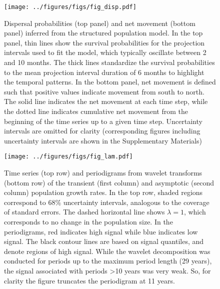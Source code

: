 \documentclass[11pt]{article}
\begin{document}
\clearpage
\begin{figure}
\centering
\texttt{[image: ../figures/figs/fig\_disp.pdf]}
\caption{\label{fig:disp}
Dispersal probabilities (top panel) and net movement (bottom panel)
inferred from the structured population model.
In the top panel,
thin lines show the survival probabilities for the projection intervals
used to fit the model, 
which typically oscillate between 2 and 10 months.
The thick lines standardize the survival probabilities to the mean 
projection interval duration of 6 months to highlight the temporal patterns.
In the bottom panel,
net movement is defined such that positive values indicate movement from
south to north.
The solid line indicates the net movement at each time step,
while the dotted line indicates cumulative net movement from the 
beginning of the time series up to a given time step.
Uncertainty intervals are omitted for clarity 
(corresponding figures including uncertainty intervals are shown 
in the Supplementary Materials)
}
\end{figure}
\clearpage

\clearpage
\begin{figure}
\centering
\texttt{[image: ../figures/figs/fig\_lam.pdf]}
\caption{\label{fig:lam}
Time series (top row) and periodigrams from wavelet transforms (bottom row) 
of the transient (first column) and asymptotic (second column) population growth rates.
In the top row, shaded regions correspond to 68\% uncertainty intervals,
analogous to the coverage of standard errors.
The dashed horizontal line shows $\lambda=1$, 
which corresponds to no change in the population size.
In the periodigrams, red indicates high signal while blue indicates low signal. 
The black contour lines are based on signal quantiles, and denote regions of high signal.
While the wavelet decomposition was conducted for periods up to the maximum period length
(29 years), the signal associated with periods >10 years was very weak. 
So, for clarity the figure truncates the periodigram at 11 years.
}
\end{figure}
\clearpage
\end{document}
